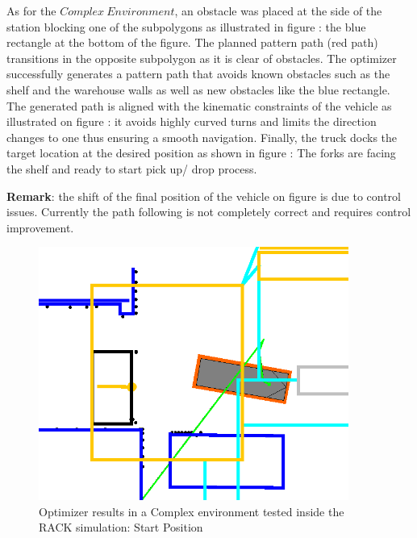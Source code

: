 As for the \(Complex~Environment\), an obstacle was placed at the side of the station 
blocking one of the subpolygons as illustrated in figure : the blue rectangle at the bottom 
of the figure.
The planned pattern path (red path) transitions in the opposite subpolygon as it is clear of obstacles.
The optimizer successfully generates a pattern path that avoids known obstacles such as the shelf and 
the warehouse walls as well as new obstacles like the blue rectangle. 
The generated path is aligned with the kinematic constraints of the vehicle as illustrated on figure : 
it avoids highly curved turns and limits the direction changes to one thus ensuring a smooth navigation.
Finally, the truck docks the target location at the desired position as shown in figure : 
The forks are facing the shelf and ready to start pick up/ drop process. 

\textbf{Remark}: the shift of the final position of the vehicle on figure  is due 
to control issues. Currently the path following is not completely correct and requires 
control improvement.

\begin{figure}[H]
    \begin{center}
        \includegraphics[width=4in]{images/Chap3/4.png} %
        \caption{Optimizer results in a Complex environment tested inside the RACK simulation: Start Position}
        \label{OptResult6}
        \end{center}    
\end{figure}

